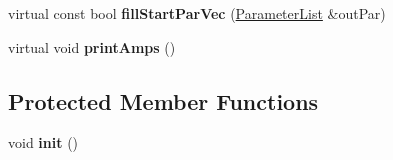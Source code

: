 \begin{DoxyCompactItemize}
\item 
\hypertarget{class_amp_sum_intensity_a5836b640fcd3270cc2ab5b730ae50b35}{virtual const bool {\bfseries fill\-Start\-Par\-Vec} (\hyperlink{class_parameter_list}{Parameter\-List} \&out\-Par)}\label{class_amp_sum_intensity_a5836b640fcd3270cc2ab5b730ae50b35}

\item 
\hypertarget{class_amp_sum_intensity_ae84ea31434dacf7cfaeed06c3f3fb414}{virtual void {\bfseries print\-Amps} ()}\label{class_amp_sum_intensity_ae84ea31434dacf7cfaeed06c3f3fb414}

\end{DoxyCompactItemize}
\subsection*{Protected Member Functions}
\begin{DoxyCompactItemize}
\item 
\hypertarget{class_amp_sum_intensity_a5c9786f704fc4f686705afb44fd47b45}{void {\bfseries init} ()}\label{class_amp_sum_intensity_a5c9786f704fc4f686705afb44fd47b45}

\end{DoxyCompactItemize}
